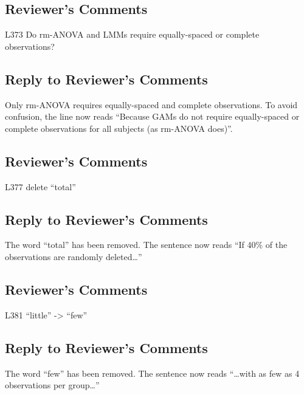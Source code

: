 \documentclass[
]{article}
\begin{document}
\hypertarget{reviewers-comments-30}{%
\subsection{Reviewer's Comments}\label{reviewers-comments-30}}

L373 Do rm-ANOVA and LMMs require equally-spaced or complete observations?

\hypertarget{section-31}{%
\subsection{\texorpdfstring{\textcolor{reviewersblue} {Reply to Reviewer's Comments}}{}}\label{section-31}}

Only rm-ANOVA requires equally-spaced and complete observations. To avoid confusion, the line now reads ``Because GAMs do not require equally-spaced or complete observations for all subjects (as rm-ANOVA does)''.

\hypertarget{reviewers-comments-31}{%
\subsection{Reviewer's Comments}\label{reviewers-comments-31}}

L377 delete ``total''

\hypertarget{section-32}{%
\subsection{\texorpdfstring{\textcolor{reviewersblue} {Reply to Reviewer's Comments}}{}}\label{section-32}}

The word ``total'' has been removed. The sentence now reads ``If 40\% of the observations are randomly deleted\ldots{}''

\hypertarget{reviewers-comments-32}{%
\subsection{Reviewer's Comments}\label{reviewers-comments-32}}

L381 ``little'' -\textgreater{} ``few''

\hypertarget{section-33}{%
\subsection{\texorpdfstring{\textcolor{reviewersblue} {Reply to Reviewer's Comments}}{}}\label{section-33}}

The word ``few'' has been removed. The sentence now reads ``\ldots with as few as 4 observations per group\ldots{}''
\end{document}
